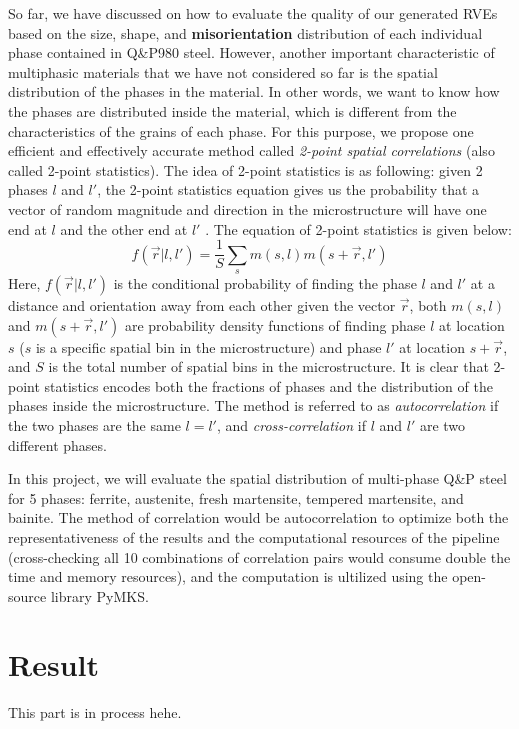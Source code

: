 So far, we have discussed on how to evaluate the quality of our generated RVEs based on the size, shape, and \textbf{misorientation} distribution of each individual phase contained in Q\&P980 steel. However, another important characteristic of multiphasic materials that we have not considered so far is the spatial distribution of the phases in the material. In other words, we want to know how the phases are distributed inside the material, which is different from the characteristics of the grains of each phase. For this purpose, we propose one efficient and effectively accurate method called \textit{2-point spatial correlations} (also called 2-point statistics). The idea of 2-point statistics is as following: given 2 phases $l$ and $l'$, the 2-point statistics equation gives us the probability that a vector of random magnitude and direction in the microstructure will have one end at $l$ and the other end at $l'$ \cite{Yucel2020}. The equation of 2-point statistics is given below:
\begin{equation}
f(\vec{r} \vert l, l') = \frac{1}{S}\sum_{s} m(s, l)m(s+\vec{r}, l')
\end{equation}
Here, $f(\vec{r} \vert l, l')$ is the conditional probability of finding the phase $l$ and $l'$ at a distance and orientation away from each other given the vector $\vec{r}$, both $m(s, l)$ and $m(s+\vec{r}, l')$ are probability density functions of finding phase $l$ at location $s$ ($s$ is a specific spatial bin in the microstructure) and phase $l'$ at location $s+\vec{r}$, and $S$ is the total number of spatial bins in the microstructure. It is clear that 2-point statistics encodes both the fractions of phases and the distribution of the phases inside the microstructure. The method is referred to as \textit{autocorrelation} if the two phases are the same $l = l'$, and \textit{cross-correlation} if $l$ and $l'$ are two different phases.

In this project, we will evaluate the spatial distribution of multi-phase Q\&P steel for 5 phases: ferrite, austenite, fresh martensite, tempered martensite, and bainite. The method of correlation would be autocorrelation to optimize both the representativeness of the results and the computational resources of the pipeline (cross-checking all 10 combinations of correlation pairs would consume double the time and memory resources), and the computation is ultilized using the open-source library PyMKS.


\chapter{Result}
This part is in process hehe.

